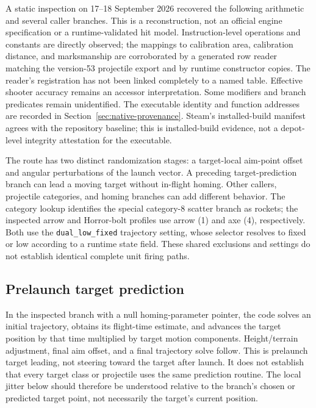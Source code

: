 \documentclass[11pt]{article}
\begin{document}
A static inspection on 17--18 September 2026 recovered the following arithmetic
and several caller branches.  This is a reconstruction, not an official
engine specification or a runtime-validated hit model.  Instruction-level
operations and constants are directly observed; the mappings to calibration
area, calibration distance, and marksmanship are corroborated by a generated
row reader matching the version-53 projectile export and by runtime constructor
copies.  The reader's registration has not been linked completely to a named
table.  Effective shooter accuracy remains an accessor interpretation.
Some modifiers and branch predicates
remain unidentified.  The executable identity and function addresses are
recorded in Section~\ref{sec:native-provenance}.  Steam's installed-build
manifest agrees with the repository baseline; this is installed-build
evidence, not a depot-level integrity attestation for the executable.

The route has two distinct randomization stages: a target-local aim-point
offset and angular perturbations of the launch vector.  A preceding
target-prediction branch can lead a moving target without in-flight homing.
Other callers,
projectile categories, and homing branches can add different behavior.
The category lookup identifies the special category-8 scatter branch as
rockets; the inspected arrow and Horror-bolt profiles use arrow (1) and axe
(4), respectively.  Both use the \texttt{dual\_low\_fixed} trajectory setting,
whose selector resolves to fixed or low according to a runtime state field.
These shared exclusions and settings do not establish identical complete
unit firing paths.

\subsection{Prelaunch target prediction}

In the inspected branch with a null homing-parameter pointer, the code
solves an initial trajectory, obtains its flight-time estimate, and advances
the target position by that time multiplied by target motion components.
Height/terrain adjustment, final aim offset, and a final trajectory solve
follow.  This is prelaunch target leading, not steering toward the target
after launch.  It does not establish that every target class or projectile
uses the same prediction routine.  The local jitter below should therefore
be understood relative to the branch's chosen or predicted target point,
not necessarily the target's current position.
\end{document}
